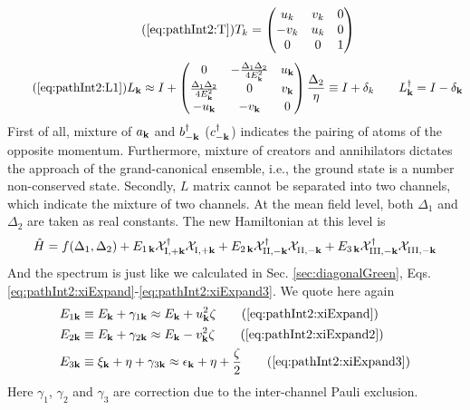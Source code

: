 \begin{equation}\tag{\ref{eq:pathInt2:T}}
T_k=\mtrx{u_k&v_k&0\\-v_k&u_k&0\\0&0&1}
\end{equation}
\begin{equation}\tag{\ref{eq:pathInt2:L1}}
L_{\vk}\approx{}I+
\mtrx{0&-\frac{\Delta_{1}{}\Delta_{2}{}}{4E^{2}_{\vk}}&u_{\vk}\\
\frac{\Delta_{1}{}\Delta_{2}{}}{4E^{2}_{\vk}}&0&v_{\vk}\\
-u_{\vk}&-v_{\vk}&0
}\frac{\Delta_{2}{}}{\eta}
\equiv{}I+\delta_{k}\qquad
L^{\dg}_{\vk}=I-\delta_{\vk}
\end{equation}
First of all, mixture of $a_{\mathbf{k}}$ and $b^{\dagger}_{-\mathbf{k}}$ ($c^{\dagger}_{-\mathbf{k}}$) indicates the pairing of atoms of the opposite momentum. Furthermore,   mixture of creators and annihilators dictates the approach of the grand-canonical ensemble, i.e., the ground state is a number non-conserved state.   Secondly, $L$ matrix cannot be separated into two channels, which indicate the mixture of two channels.   At the mean field level, both $\Delta_{1}$ and $\Delta_{2}$ are taken as real constants.  The new Hamiltonian at this level is 
\begin{equation}
\hat{H}=f(\Delta_{1},\Delta_{2})+E_{1\,\mathbf{k}}\mathcal{X}^{\dagger}_{\text{I},+\mathbf{k}}\mathcal{X}^{}_{\text{I},+\mathbf{k}}
+E_{2\,\mathbf{k}}\mathcal{X}^{\dagger}_{\text{II},-\mathbf{k}}\mathcal{X}^{}_{\text{II},-\mathbf{k}}
+E_{3\,\mathbf{k}}\mathcal{X}^{\dagger}_{\text{III},-\mathbf{k}}\mathcal{X}^{}_{\text{III},-\mathbf{k}}
\end{equation}
And the spectrum is just like we calculated in Sec. \ref{sec:diagonalGreen}, Eqs. \ref{eq:pathInt2:xiExpand}-\ref{eq:pathInt2:xiExpand3}.  We quote here again
\begin{align}
E_{1\vk}&\equiv{}E_{\vk}+\gamma_{1\vk}\approx{}E_{\vk}+u_{\vk}^{2}\zeta\tag{\ref{eq:pathInt2:xiExpand}}\\
E_{2\vk}&\equiv{}E_{\vk}+\gamma_{2\vk}
\approx{}E_{\vk}-v_{\vk}^{2}\zeta\tag{\ref{eq:pathInt2:xiExpand2}}\\
E_{3\vk}&\equiv{}\xi_{\vk}+\eta+\gamma_{3\vk}\approx{}\epsilon_{\vk}+\eta+\frac{\zeta}{2}
\tag{\ref{eq:pathInt2:xiExpand3}}
\end{align}
Here $\gamma_{1}$, $\gamma_{2}$ and $\gamma_{3}$ are correction due to the inter-channel Pauli exclusion. 

